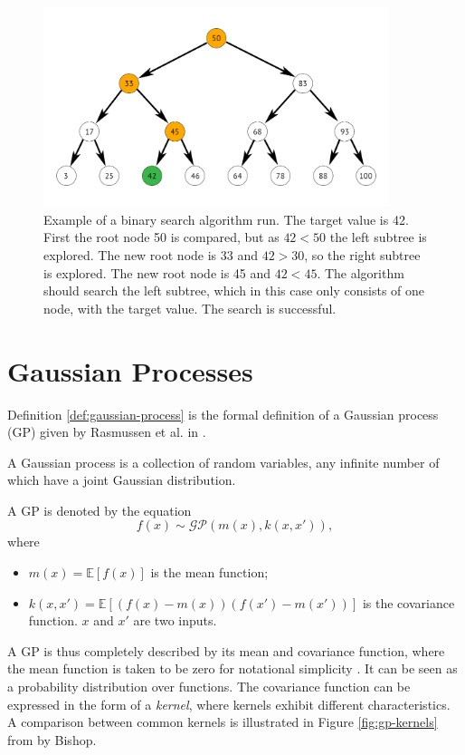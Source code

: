 \begin{figure}[t!]
    \centering
    \includegraphics[width=0.9\textwidth]{figures/binary_search_algorithm}
    \caption{Example of a binary search algorithm run.
    The target value is 42.
    First the root node 50 is compared, but as $42 < 50$ the left subtree is explored.
    The new root node is 33 and $42 > 30$, so the right subtree is explored.
    The new root node is 45 and $42 < 45$.
    The algorithm should search the left subtree, which in this case only consists of one node, with the target value.
    The search is successful.}
    \label{fig:binary-search-algorithm}
\end{figure}

\section{Gaussian Processes}
Definition \ref{def:gaussian-process} is the formal definition of a Gaussian process (GP) given by Rasmussen et al. in \cite{Rasmussen2006}.

\begin{definition} \label{def:gaussian-process}
    A Gaussian process is a collection of random variables, any infinite number of which have a joint Gaussian distribution.
\end{definition}

A GP is denoted by the equation
\[f(x) \sim \mathcal{GP}(m(x), k(x, x')),\]
where 
\begin{itemize}
    \item $m(x) = \mathbb{E}[f(x)]$ is the mean function;
    \item $k(x, x') = \mathbb{E}[(f(x) - m(x))(f(x') - m(x'))]$ is the covariance function.
    $x$ and $x'$ are two inputs.
\end{itemize}
A GP is thus completely described by its mean and covariance function, where the mean function is taken to be zero for notational simplicity \cite{Rasmussen2006}.
It can be seen as a probability distribution over functions.
The covariance function can be expressed in the form of a \textit{kernel}, where kernels exhibit different characteristics.
A comparison between common kernels is illustrated in Figure \ref{fig:gp-kernels} from \cite{Bishop2006} by Bishop.

